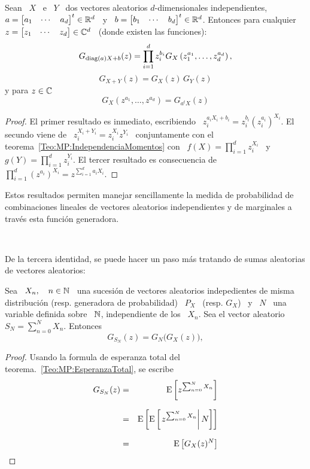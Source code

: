 \begin{teorema}%
\label{Teo:MP:PropiedadesGeneradoraProbabilidad}
%
  Sean  \   $X$  \  e  \   $Y$  \  dos   vectores  aleatorios  $d$-dimensionales
  independientes, $a  = \begin{bmatrix} a_1  & \cdots & a_d  \end{bmatrix}^t \in
  \mathbb{R}^d$ \  y \ $b  = \begin{bmatrix} b_1  & \cdots & b_d  \end{bmatrix}^t \in
  \mathbb{R}^d$.  Entonces  para  cualquier  $z  = \begin{bmatrix}  z_1  &  \cdots  &
    z_d \end{bmatrix}\in \mathbb{C}^d$ \ (donde existen las funciones):
  \[
  G_{\operatorname{diag}(a) X + b}(z) =  \prod_{i=1}^d z_i^{b_i} G_X\left( z_1^{a_1} , \ldots ,
    z_d^{a_d} \right),
  \]
  \[
  G_{X+Y}(z) = G_X(z) \, G_Y(z)
  \]
  y para $z \in \mathbb{C}$
  \[
  G_X\left( z^{a_1} , \ldots , z^{a_d} \right) = G_{a^t X}(z)
  \]
\end{teorema}
%
\begin{proof}
  El  primer  resultado es  inmediato,  escribiendo \  $z_i^{a_i  X_i  + b_i}  =
  z_i^{b_i}   \left(  z_i^{a_i}   \right)^{X_i}$.    El  secundo   viene  de   \
  $z_i^{X_i+Y_i}    =    z_i^{X_i}    z^{Y_i}$    \   conjuntamente    con    el
  teorema~\ref{Teo:MP:IndependenciaMomentos}   con   \   $f(X)  =   \prod_{i=1}^d
  z_i^{X_i}$  \ y \  $g(Y) =  \prod_{i=1}^d z_i^{Y_i}$.  El tercer  resultado es
  consecuencia de $\prod_{i=1}^d  \left( z^{a_i} \right)^{X_i} = z^{\sum_{i=1}^d
    a_i X_i}$.
\end{proof}
%
Estos  resultados permiten manejar  sencillamente la  medida de  probabilidad de
combinaciones lineales  de vectores aleatorios independientes y  de marginales a
trav\'es esta funci\'on generadora.

\

De  la  tercera identidad,  se  puede  hacer un  paso  m\'as  tratando de  sumas
aleatorias de vectores aleatorios:
%
\begin{teorema}
\label{Teo:MP:SumaAleatoriaGeneradoraProbabilidad}
%
  Sea  \ $X_n,  \quad n  \in  \mathbb{N}$ \,  una sucesi\'on  de vectores  aleatorios
  indepedientes de  misma distribuci\'on  (resp.  generadora de  probabilidad) \
  $P_X$ \  (resp. $G_X$)  \ y  \ $N$ \  una variable  definida sobre  \ $\mathbb{N}$,
  independiente de los  \ $X_n$. Sea el vector aleatorio \  $ S_N = \sum_{n=0}^N
  X_n$. Entonces
  \[
  G_{S_N}(z) =  G_N \big( G_X(z) \big),
  \]
\end{teorema}
%
\begin{proof}
  Usando la formula de esperanza total del teorema.~\ref{Teo:MP:EsperanzaTotal}, se escribe
  \begin{eqnarray*}
  G_{S_N}(z) & = & \operatorname{E}\left[ z^{\sum_{n=0}^N X_n} \right]\\[2.5mm]
  & = & \operatorname{E}\left[ \operatorname{E}\left[ \left. z^{\sum_{n=0}^N X_n} \right| N  \right] \right]\\[2.5mm]
  & = & \operatorname{E}\left[ G_X(z)^N \right]
  \end{eqnarray*}
\end{proof}


